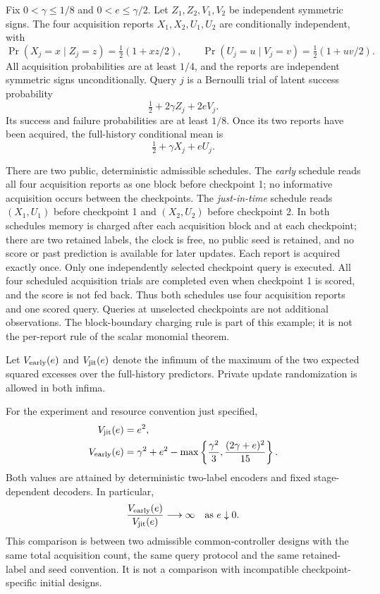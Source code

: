 Fix $0<\gamma\le1/8$ and $0<e\le \gamma/2$. Let
$Z_1,Z_2,V_1,V_2$ be independent symmetric signs. The four acquisition
reports $X_1,X_2,U_1,U_2$ are conditionally independent, with
\[
 \Pr(X_j=x\mid Z_j=z)=\tfrac12(1+xz/2),\qquad
 \Pr(U_j=u\mid V_j=v)=\tfrac12(1+uv/2).
\]
All acquisition probabilities are at least $1/4$, and the reports are
independent symmetric signs unconditionally. Query $j$ is a Bernoulli
trial of latent success probability
\[
             \tfrac12+2\gamma Z_j+2eV_j.
\]
Its success and failure probabilities are at least $1/8$. Once its two
reports have been acquired, the full-history conditional mean is
\begin{equation}\label{eq:v32-delayed-target}
              \tfrac12+\gamma X_j+eU_j.
\end{equation}

There are two public, deterministic admissible schedules. The
\emph{early} schedule reads all four acquisition reports as one block
before checkpoint 1; no informative acquisition occurs between the
checkpoints. The \emph{just-in-time} schedule reads $(X_1,U_1)$ before
checkpoint 1 and $(X_2,U_2)$ before checkpoint 2. In both schedules
memory is charged after each acquisition block and at each checkpoint;
there are two retained labels, the clock is free, no public seed is
retained, and no score or past prediction is available for later updates.
Each report is acquired exactly once. Only one independently selected
checkpoint query is executed. All four scheduled acquisition trials are
completed even when checkpoint 1 is scored, and the score is not fed back.
Thus both schedules use four acquisition reports and one scored query.
Queries at unselected checkpoints are not additional observations. The block-boundary charging
rule is part of this example; it is not the per-report rule of the scalar
monomial theorem.

Let $V_{\rm early}(e)$ and $V_{\rm jit}(e)$ denote the infimum of the
maximum of the two expected squared excesses over the full-history
predictors. Private update randomization is allowed in both infima.

\begin{theorem}\label{thm:v32-delayed}
For the experiment and resource convention just specified,
\begin{equation}\label{eq:v32-delayed-exact}
 \begin{split}
 V_{\rm jit}(e)&=e^2,\\
 V_{\rm early}(e)&=\gamma^2+e^2-
       \max\left\{\frac{\gamma^2}{3},
                       \frac{(2\gamma+e)^2}{15}\right\}.
 \end{split}
\end{equation}
Both values are attained by deterministic two-label encoders and fixed
stage-dependent decoders. In particular,
\[
 \frac{V_{\rm early}(e)}{V_{\rm jit}(e)}\longrightarrow\infty
                         \quad\hbox{as }e\downarrow0.
\]
This comparison is between two admissible common-controller designs with
the same total acquisition count, the same query protocol and the same
retained-label and seed convention. It is not a comparison with
incompatible checkpoint-specific initial designs.
\end{theorem}

